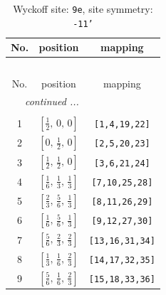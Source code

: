 \documentclass[fleqn,8pt]{jsarticle}
\begin{document}
\begin{longtable}{ccc}
\caption{Wyckoff site: {\tt 9e}, site symmetry: {\tt -11'}}
 \\
 \hline \hline
No. & position & mapping \\ \hline \endfirsthead

\multicolumn{2}{l}{\tablename\ \thetable{}} \\
 \hline \hline
No. & position & mapping \\ \hline \endhead

 \hline \hline
\multicolumn{2}{r}{\footnotesize\it continued ...} \\ \endfoot

 \hline \hline
\multicolumn{2}{r}{} \\ \endlastfoot

1 & $\left[ \frac{1}{2},\, 0,\, 0 \right]$ & {\tt [1,4,19,22]} \\ \hline
2 & $\left[ 0,\, \frac{1}{2},\, 0 \right]$ & {\tt [2,5,20,23]} \\ \hline
3 & $\left[ \frac{1}{2},\, \frac{1}{2},\, 0 \right]$ & {\tt [3,6,21,24]} \\ \hline
4 & $\left[ \frac{1}{6},\, \frac{1}{3},\, \frac{1}{3} \right]$ & {\tt [7,10,25,28]} \\ \hline
5 & $\left[ \frac{2}{3},\, \frac{5}{6},\, \frac{1}{3} \right]$ & {\tt [8,11,26,29]} \\ \hline
6 & $\left[ \frac{1}{6},\, \frac{5}{6},\, \frac{1}{3} \right]$ & {\tt [9,12,27,30]} \\ \hline
7 & $\left[ \frac{5}{6},\, \frac{2}{3},\, \frac{2}{3} \right]$ & {\tt [13,16,31,34]} \\ \hline
8 & $\left[ \frac{1}{3},\, \frac{1}{6},\, \frac{2}{3} \right]$ & {\tt [14,17,32,35]} \\ \hline
9 & $\left[ \frac{5}{6},\, \frac{1}{6},\, \frac{2}{3} \right]$ & {\tt [15,18,33,36]} \\
\end{longtable}
\renewcommand{\arraystretch}{1.2}
\end{document}
